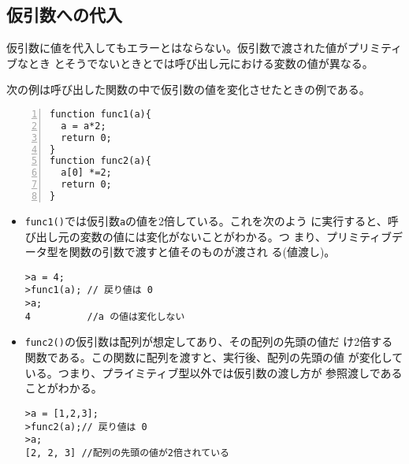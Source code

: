 
\subsection{仮引数への代入}
\renewcommand{\theFancyVerbLine}{\normalsize\arabic{FancyVerbLine}}
仮引数に値を代入してもエラーとはならない。仮引数で渡された値がプリミティブなとき
とそうでないときとでは呼び出し元における変数の値が異なる。
\begin{Exec}\label{Params}\upshape
 次の例は呼び出した関数の中で仮引数の値を変化させたときの例である。
\begin{Verbatim}[numbers=left]
function func1(a){
  a = a*2;
  return 0;
}
function func2(a){
  a[0] *=2;
  return 0;
}
\end{Verbatim}
\end{Exec}
\begin{itemize}
 \item \Verb+func1()+では仮引数\Verb+a+の値を2倍している。これを次のよう
       に実行すると、呼び出し元の変数の値には変化がないことがわかる。つ
       まり、プリミティブデータ型を関数の引数で渡すと値そのものが渡され
       る(値渡し)。
\begin{Verbatim}
>a = 4;
>func1(a); // 戻り値は 0
>a;
4          //a の値は変化しない
\end{Verbatim}
 \item \Verb+func2()+の仮引数は配列が想定してあり、その配列の先頭の値だ
       け2倍する関数である。この関数に配列を渡すと、実行後、配列の先頭の値
       が変化している。つまり、プライミティブ型以外では仮引数の渡し方が
       参照渡しであることがわかる。
\begin{Verbatim}
>a = [1,2,3];
>func2(a);// 戻り値は 0
>a;
[2, 2, 3] //配列の先頭の値が2倍されている
\end{Verbatim}
\end{itemize}
\iffalse

